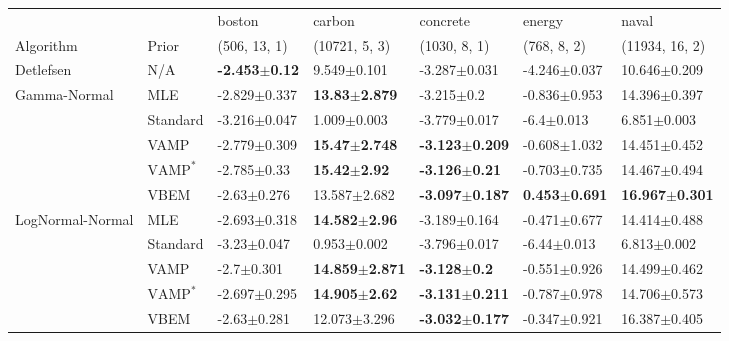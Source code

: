 \begin{tabular}{lllllll}
\toprule
                 &      &                    boston &                     carbon &                   concrete &                    energy &                      naval \\
Algorithm & Prior& (506, 13, 1)& (10721, 5, 3)& (1030, 8, 1)& (768, 8, 2)& (11934, 16, 2)\\
\midrule
Detlefsen & N/A &  \textbf{-2.453$\pm$0.12} &            9.549$\pm$0.101 &           -3.287$\pm$0.031 &          -4.246$\pm$0.037 &           10.646$\pm$0.209 \\
Gamma-Normal & MLE &          -2.829$\pm$0.337 &   \textbf{13.83$\pm$2.879} &             -3.215$\pm$0.2 &          -0.836$\pm$0.953 &           14.396$\pm$0.397 \\
                 & Standard &          -3.216$\pm$0.047 &            1.009$\pm$0.003 &           -3.779$\pm$0.017 &            -6.4$\pm$0.013 &            6.851$\pm$0.003 \\
                 & VAMP &          -2.779$\pm$0.309 &   \textbf{15.47$\pm$2.748} &  \textbf{-3.123$\pm$0.209} &          -0.608$\pm$1.032 &           14.451$\pm$0.452 \\
                 & $\text{VAMP}^*$ &           -2.785$\pm$0.33 &    \textbf{15.42$\pm$2.92} &   \textbf{-3.126$\pm$0.21} &          -0.703$\pm$0.735 &           14.467$\pm$0.494 \\
                 & VBEM &           -2.63$\pm$0.276 &           13.587$\pm$2.682 &  \textbf{-3.097$\pm$0.187} &  \textbf{0.453$\pm$0.691} &  \textbf{16.967$\pm$0.301} \\
LogNormal-Normal & MLE &          -2.693$\pm$0.318 &   \textbf{14.582$\pm$2.96} &           -3.189$\pm$0.164 &          -0.471$\pm$0.677 &           14.414$\pm$0.488 \\
                 & Standard &           -3.23$\pm$0.047 &            0.953$\pm$0.002 &           -3.796$\pm$0.017 &           -6.44$\pm$0.013 &            6.813$\pm$0.002 \\
                 & VAMP &            -2.7$\pm$0.301 &  \textbf{14.859$\pm$2.871} &    \textbf{-3.128$\pm$0.2} &          -0.551$\pm$0.926 &           14.499$\pm$0.462 \\
                 & $\text{VAMP}^*$ &          -2.697$\pm$0.295 &   \textbf{14.905$\pm$2.62} &  \textbf{-3.131$\pm$0.211} &          -0.787$\pm$0.978 &           14.706$\pm$0.573 \\
                 & VBEM &           -2.63$\pm$0.281 &           12.073$\pm$3.296 &  \textbf{-3.032$\pm$0.177} &          -0.347$\pm$0.921 &           16.387$\pm$0.405 \\

\end{tabular}
